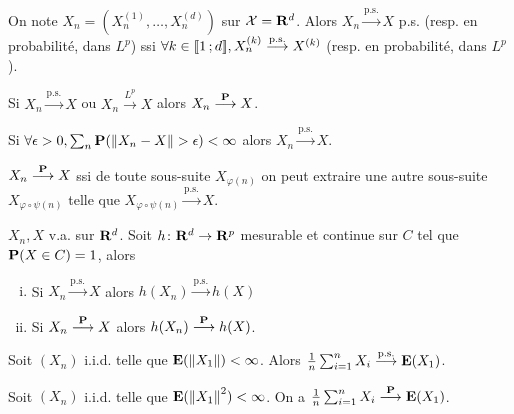 	\begin{pop}
		On note $X_n = \left( X_n^{(1)},\ldots,X_n^{(d)} \right)$ sur $\mathcal{X} = \mathbf{R}^d$.
		Alors $X_n \overset{\text{p.s.}}{\longrightarrow} X$ p.s. (resp. en probabilité, dans $L^p$) ssi $\forall k \in \mathopen{[\![}1\mathclose{}\mathpunct{};d\mathclose{]\!]}, X_n^{(k)} \overset{\text{p.s.}}{\longrightarrow} X^{(k)}$ (resp. en probabilité, dans $L^p$).
	\end{pop}

	\begin{pop}
		Si $X_n \overset{\text{p.s.}}{\longrightarrow} X$ ou $X_n \overset{L^p}{\longrightarrow} X$ alors $X_n \overset{\mathbf{P}}{\longrightarrow} X$.
	\end{pop}

	\begin{pop}
		Si $\forall \epsilon > 0, \sum_n \mathbf{P}(\left\lVert X_n - X\right\rVert > \epsilon) < \infty$ alors $X_n \overset{\text{p.s.}}{\longrightarrow} X$.
	\end{pop}

	\begin{pop}
		$X_n \overset{\mathbf{P}}{\longrightarrow} X$ ssi de toute sous-suite $X_{\varphi(n)}$ on peut extraire une autre sous-suite $X_{\varphi \circ \psi(n)}$ telle que $X_{\varphi \circ \psi(n)} \overset{\text{p.s.}}{\longrightarrow} X$.
	\end{pop}

	\begin{thm}
		$X_n, X$ v.a. sur $\mathbf{R}^d$.
		Soit $h \colon \mathbf{R}^d \to \mathbf{R}^p$ mesurable et continue sur $C$ tel que $\mathbf{P}(X \in C) = 1$, alors
		\begin{enumerate}[(i)]
			\item Si $X_n \overset{\text{p.s.}}{\longrightarrow} X$ alors $h(X_n) \overset{\text{p.s.}}{\longrightarrow} h(X)$
			\item Si $X_n \overset{\mathbf{P}}{\longrightarrow} X$ alors $h(X_n) \overset{\mathbf{P}}{\longrightarrow} h(X)$.
		\end{enumerate}
	\end{thm}

	\begin{thm}
		Soit $(X_n)$ i.i.d. telle que $\mathbf{E}(\left\lVert X_1\right\rVert) < \infty$.
		Alors $\frac{1}{n} \sum_{i = 1}^n X_i \overset{\text{p.s.}}{\longrightarrow} \mathbf{E}(X_1)$.
	\end{thm}

	\begin{thm}
		Soit $(X_n)$ i.i.d. telle que $\mathbf{E}(\left\lVert X_1\right\rVert^2) < \infty$.
		On a $\frac{1}{n} \sum_{i = 1}^n X_i \overset{\mathbf{P}}{\longrightarrow} \mathbf{E}(X_1)$.
	\end{thm}


